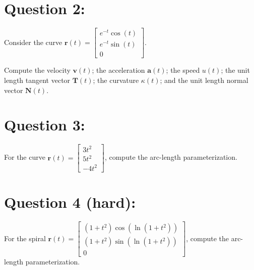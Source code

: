 \documentclass{article}
\newcommand{\colvec}[3]{\begin{bmatrix} #1 \\ #2 \\ #3 \end{bmatrix}}
\begin{document}
\section*{Question 2:}

Consider the curve \(\mathbf{r}(t) = \colvec{e^{-t}\cos(t)}{e^{-t}\sin(t)}{0}\).

Compute the velocity \(\mathbf{v}(t)\); the acceleration \(\mathbf{a}(t)\); the speed \(u(t)\); the unit length tangent vector \(\mathbf{T}(t)\); the curvature \(\kappa(t)\); and the unit length normal vector \(\mathbf{N}(t)\).

%



\section*{Question 3:}

For the curve \(\mathbf{r}(t) = \colvec{3t^2}{5t^2}{-4t^2}\), compute the arc-length parameterization.



\section*{Question 4 (hard):}

For the spiral \(\mathbf{r}(t) = \colvec{(1 + t^2)\cos(\ln(1 + t^2))}{(1 + t^2)\sin(\ln(1 + t^2))}{0}\), compute the arc-length parameterization.
\end{document}
